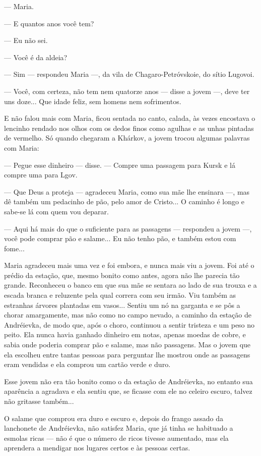 --- Maria.

--- E quantos anos você tem?

--- Eu não sei.

--- Você é da aldeia?

--- Sim --- respondeu Maria ---, da vila de Chagaro-Petróvskoie, do
sítio Lugovoi.

--- Você, com certeza, não tem nem quatorze anos --- disse a jovem ---,
deve ter uns doze... Que idade feliz, sem homens nem sofrimentos.

E não falou mais com Maria, ficou sentada no canto, calada, às vezes
encostava o lencinho rendado nos olhos com os dedos finos como agulhas e
as unhas pintadas de vermelho. Só quando chegaram a Khárkov, a jovem
trocou algumas palavras com Maria:

--- Pegue esse dinheiro --- disse. --- Compre uma passagem para Kursk e
lá compre uma para Lgov.

--- Que Deus a proteja --- agradeceu Maria, como sua mãe lhe ensinara
---, mas dê também um pedacinho de pão, pelo amor de Cristo... O caminho
é longo e sabe-se lá com quem vou deparar.

--- Aqui há mais do que o suficiente para as passagens --- respondeu a
jovem ---, você pode comprar pão e salame... Eu não tenho pão, e também
estou com fome...

Maria agradeceu mais uma vez e foi embora, e nunca mais viu a jovem. Foi
até o prédio da estação, que, mesmo bonito como antes, agora não lhe
parecia tão grande. Reconheceu o banco em que sua mãe se sentara ao lado
de sua trouxa e a escada branca e reluzente pela qual correra com seu
irmão. Viu também as estranhas árvores plantadas em vasos... Sentiu um
nó na garganta e se pôs a chorar amargamente, mas não como no campo
nevado, a caminho da estação de Andréievka, de modo que, após o choro,
continuou a sentir tristeza e um peso no peito. Ela nunca havia ganhado
dinheiro em notas, apenas moedas de cobre, e sabia onde poderia comprar
pão e salame, mas não passagens. Mas o jovem que ela escolheu entre
tantas pessoas para perguntar lhe mostrou onde as passagens eram
vendidas e ela comprou um cartão verde e duro.

Esse jovem não era tão bonito como o da estação de Andréievka, no
entanto sua aparência a agradava e ela sentiu que, se ficasse com ele no
celeiro escuro, talvez não gritasse também...

O salame que comprou era duro e escuro e, depois do frango assado da
lanchonete de Andréievka, não satisfez Maria, que já tinha se habituado
a esmolas ricas --- não é que o número de ricos tivesse aumentado, mas
ela aprendera a mendigar nos lugares certos e às pessoas certas.

